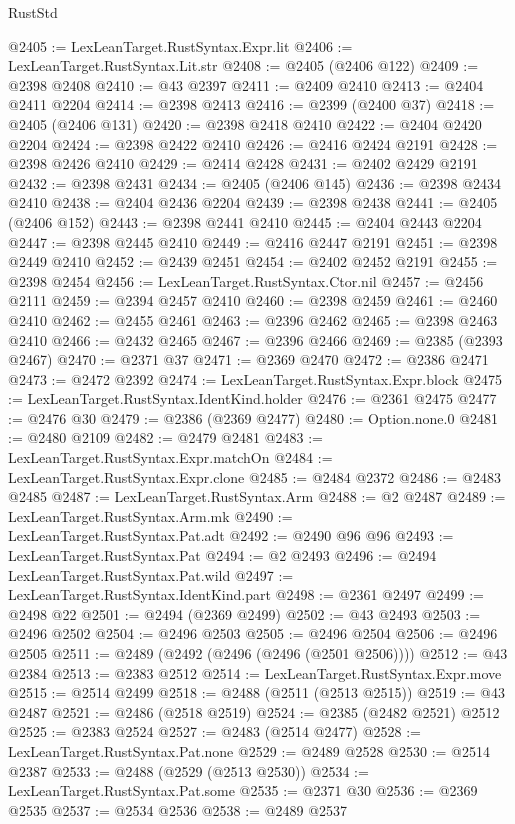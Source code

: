 \begin{lexlean}{RustStd}
\begin{coremodule}
{\begin{coremodule}
{{{{{{{{{{{{{{{{{{{{{{{{{{{{{{{{{{{{{{{{{{{{{{{{{{@2405 := LexLeanTarget.RustSyntax.Expr.lit
@2406 := LexLeanTarget.RustSyntax.Lit.str
@2408 := @2405 (@2406 @122)
@2409 := @2398 @2408
@2410 := @43 @2397
@2411 := @2409 @2410
@2413 := @2404 @2411 @2204
@2414 := @2398 @2413
@2416 := @2399 (@2400 @37)
@2418 := @2405 (@2406 @131)
@2420 := @2398 @2418 @2410
@2422 := @2404 @2420 @2204
@2424 := @2398 @2422 @2410
@2426 := @2416 @2424 @2191
@2428 := @2398 @2426 @2410
@2429 := @2414 @2428
@2431 := @2402 @2429 @2191
@2432 := @2398 @2431
@2434 := @2405 (@2406 @145)
@2436 := @2398 @2434 @2410
@2438 := @2404 @2436 @2204
@2439 := @2398 @2438
@2441 := @2405 (@2406 @152)
@2443 := @2398 @2441 @2410
@2445 := @2404 @2443 @2204
@2447 := @2398 @2445 @2410
@2449 := @2416 @2447 @2191
@2451 := @2398 @2449 @2410
@2452 := @2439 @2451
@2454 := @2402 @2452 @2191
@2455 := @2398 @2454
@2456 := LexLeanTarget.RustSyntax.Ctor.nil
@2457 := @2456 @2111
@2459 := @2394 @2457 @2410
@2460 := @2398 @2459
@2461 := @2460 @2410
@2462 := @2455 @2461
@2463 := @2396 @2462
@2465 := @2398 @2463 @2410
@2466 := @2432 @2465
@2467 := @2396 @2466
@2469 := @2385 (@2393 @2467)
@2470 := @2371 @37
@2471 := @2369 @2470
@2472 := @2386 @2471
@2473 := @2472 @2392
@2474 := LexLeanTarget.RustSyntax.Expr.block
@2475 := LexLeanTarget.RustSyntax.IdentKind.holder
@2476 := @2361 @2475
@2477 := @2476 @30
@2479 := @2386 (@2369 @2477)
@2480 := Option.none.{0}
@2481 := @2480 @2109
@2482 := @2479 @2481
@2483 := LexLeanTarget.RustSyntax.Expr.matchOn
@2484 := LexLeanTarget.RustSyntax.Expr.clone
@2485 := @2484 @2372
@2486 := @2483 @2485
@2487 := LexLeanTarget.RustSyntax.Arm
@2488 := @2 @2487
@2489 := LexLeanTarget.RustSyntax.Arm.mk
@2490 := LexLeanTarget.RustSyntax.Pat.adt
@2492 := @2490 @96 @96
@2493 := LexLeanTarget.RustSyntax.Pat
@2494 := @2 @2493
@2496 := @2494 LexLeanTarget.RustSyntax.Pat.wild
@2497 := LexLeanTarget.RustSyntax.IdentKind.part
@2498 := @2361 @2497
@2499 := @2498 @22
@2501 := @2494 (@2369 @2499)
@2502 := @43 @2493
@2503 := @2496 @2502
@2504 := @2496 @2503
@2505 := @2496 @2504
@2506 := @2496 @2505
@2511 := @2489 (@2492 (@2496 (@2496 (@2501 @2506))))
@2512 := @43 @2384
@2513 := @2383 @2512
@2514 := LexLeanTarget.RustSyntax.Expr.move
@2515 := @2514 @2499
@2518 := @2488 (@2511 (@2513 @2515))
@2519 := @43 @2487
@2521 := @2486 (@2518 @2519)
@2524 := @2385 (@2482 @2521) @2512
@2525 := @2383 @2524
@2527 := @2483 (@2514 @2477)
@2528 := LexLeanTarget.RustSyntax.Pat.none
@2529 := @2489 @2528
@2530 := @2514 @2387
@2533 := @2488 (@2529 (@2513 @2530))
@2534 := LexLeanTarget.RustSyntax.Pat.some
@2535 := @2371 @30
@2536 := @2369 @2535
@2537 := @2534 @2536
@2538 := @2489 @2537
}}}}}}}}}}}}}}}}}}}}}}}}}}}}}}}}}}}}}}}}}}}}}}}}}}
\end{coremodule}}
\end{coremodule}
\end{lexlean}
